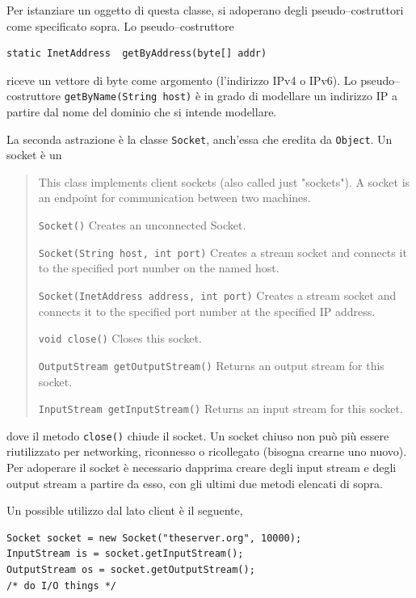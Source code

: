 \documentclass[\fontsizeclass,twocolumn]{\classname}
\theoremstyle{definition}
\theoremstyle{definition}
\begin{document}
Per istanziare un oggetto di questa classe, si adoperano degli
pseudo--costruttori come specificato sopra. Lo pseudo--costruttore

\begin{lstlisting}
static InetAddress 	getByAddress(byte[] addr) 
\end{lstlisting}

riceve un vettore di
byte come argomento (l'indirizzo IPv4 o IPv6). Lo pseudo--costruttore
\texttt{getByName(String host)} è in grado di modellare un indirizzo IP a
partire dal nome del dominio che si intende modellare.

La seconda astrazione è la classe \texttt{Socket}, anch'essa che eredita da \texttt{Object}. Un socket è un 

\begin{quote}
    \footnotesize{This class implements client sockets (also called just "sockets"). A socket is an endpoint for communication between two machines.

        \texttt{Socket()} 	Creates an unconnected Socket.

        \texttt{Socket(String host, int port)} 	Creates a stream socket and connects it to the specified port number on the named host.

        \texttt{Socket(InetAddress address, int port)} 	Creates a stream socket and connects it to the specified port number at the specified IP address.

        \texttt{void 	close()} 	Closes this socket.

            \texttt{OutputStream 	getOutputStream()} 	Returns an output stream for this socket.

    \texttt{InputStream 	getInputStream()} 	Returns an input stream for this socket.

}
\end{quote}

dove il metodo \texttt{close()} chiude il socket. Un socket chiuso non può più
essere riutilizzato per networking, riconnesso o ricollegato (bisogna crearne
uno nuovo). Per adoperare il socket è necessario dapprima creare degli input
stream e degli output stream a partire da esso, con gli ultimi due metodi
elencati di sopra.

Un possible utilizzo dal lato client è il seguente,

\begin{lstlisting}
Socket socket = new Socket("theserver.org", 10000);
InputStream is = socket.getInputStream();
OutputStream os = socket.getOutputStream();
/* do I/O things */
\end{lstlisting}
\end{document}

